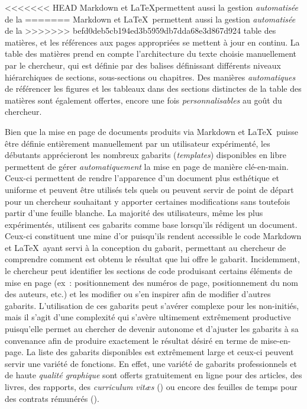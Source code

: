\documentclass[
  letterpaper,
]{scrbook}
\begin{document}
<<<<<<< HEAD
Markdown et \LaTeX permettent aussi la gestion \emph{automatisée} de la
=======
Markdown et \LaTeX~permettent aussi la gestion \emph{automatisée} de la
>>>>>>> befd0deb5cb194ed3b5959db7dda68e3d867d924
table des matières, et les références aux pages appropriées se mettent à
jour en continu. La table des matières prend en compte l'architecture du
texte choisie manuellement par le chercheur, qui est définie par des
balises définissant différents niveaux hiérarchiques de sections,
sous-sections ou chapitres. Des manières \emph{automatiques} de
référencer les figures et les tableaux dans des sections distinctes de
la table des matières sont également offertes, encore une fois
\emph{personnalisables} au goût du chercheur.

Bien que la mise en page de documents produits via Markdown et
\LaTeX~puisse être définie entièrement manuellement par un utilisateur
expérimenté, les débutants apprécieront les nombreux gabarits
(\emph{templates}) disponibles en libre permettent de gérer
\emph{automatiquement} la mise en page de manière clé-en-main. Ceux-ci
permettent de rendre l'apparence d'un document plus esthétique et
uniforme et peuvent être utilisés tels quels ou peuvent servir de point
de départ pour un chercheur souhaitant y apporter certaines
modifications sans toutefois partir d'une feuille blanche. La majorité
des utilisateurs, même les plus expérimentés, utilisent ces gabarits
comme base lorsqu'ils rédigent un document. Ceux-ci constituent une mine
d'or puisqu'ils rendent accessible le code Markdown et \LaTeX~ayant
servi à la conception du gabarit, permettant au chercheur de comprendre
comment est obtenu le résultat que lui offre le gabarit. Incidemment, le
chercheur peut identifier les sections de code produisant certains
éléments de mise en page (ex~: positionnement des numéros de page,
positionnement du nom des auteurs, etc.) et les modifier ou s'en
inspirer afin de modifier d'autres gabarits. L'utilisation de ces
gabarits peut s'avérer complexe pour les non-initiés, mais il s'agit
d'une complexité qui s'avère ultimement extrêmement productive
puisqu'elle permet au chercher de devenir autonome et d'ajuster les
gabarits à sa convenance afin de produire exactement le résultat désiré
en terme de mise-en-page. La liste des gabarits disponibles est
extrêmement large et ceux-ci peuvent servir une variété de fonctions. En
effet, une variété de gabarits professionnels et de haute \emph{qualité
graphique} sont offerts gratuitement en ligne pour des articles, des
livres, des rapports, des \emph{curriculum vitæs} () ou encore des
feuilles de temps pour des contrats rémunérés ().
\end{document}
